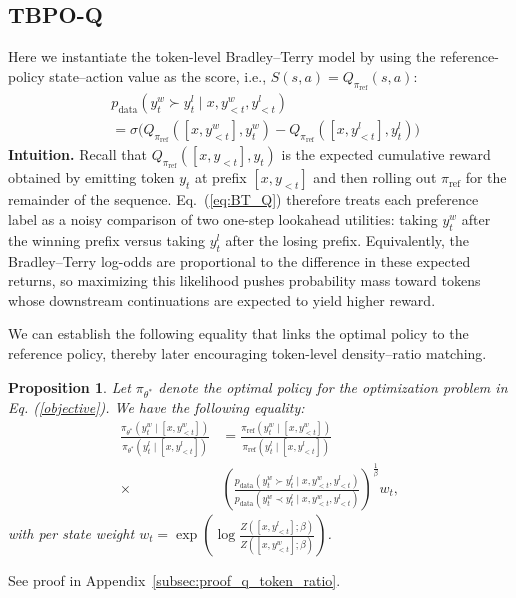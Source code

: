 \documentclass{article}
\theoremstyle{plain}
\newtheorem{proposition}[theorem]{Proposition}
\theoremstyle{definition}
\theoremstyle{remark}
\begin{document}
\subsection{TBPO-Q}
\label{sec:tbpo_q}

Here we instantiate the token-level Bradley--Terry model by using the reference-policy
state--action value as the score, i.e., $S(s,a)=Q_{\pi_{\mathrm{ref}}}(s,a)$:
\begin{equation} \label{eq:BT_Q}
\begin{split}
    &p_{\text{data}}(y^w_t \succ y_t^l \mid x, y^w_{<t}, y^l_{<t}) \\
    &= \sigma\bigl(Q_{\pi_{\mathrm{ref}}}([x, y^w_{<t}], y^w_t) - Q_{\pi_{\mathrm{ref}}}([x, y^l_{<t}], y^l_t)\bigr)
\end{split}
\end{equation}
\noindent\textbf{Intuition.}
Recall that $Q_{\pi_{\mathrm{ref}}}([x,y_{<t}],y_t)$ is the expected cumulative
reward obtained by emitting token $y_t$ at prefix $[x,y_{<t}]$ and then rolling out
$\pi_{\mathrm{ref}}$ for the remainder of the sequence.
Eq.~(\ref{eq:BT_Q}) therefore treats each preference label as a noisy comparison of two
one-step lookahead utilities: taking $y_t^w$ after the winning prefix versus taking $y_t^l$
after the losing prefix.
Equivalently, the Bradley--Terry log-odds are proportional to the difference in these expected
returns, so maximizing this likelihood pushes probability mass toward tokens whose downstream
continuations are expected to yield higher reward.

We can establish the following equality that links the optimal policy to the reference policy,
thereby later encouraging token-level density--ratio matching.
\begin{proposition}
\label{prop:q_token_ratio}
    Let $\pi_{\theta^*}$ denote the optimal policy for the optimization problem in Eq. (\ref{objective}). We have the following equality:
    \begin{equation}
    \begin{split}\frac{\pi_{\theta^*}\!\left(y_{t}^{w}\mid[x,y_{<t}^{w}]\right)}{\pi_{\theta^*}\!\left(y_{t}^{l}\mid[x,y_{<t}^{l}]\right)} & =\frac{\pi_{\mathrm{ref}}\!\left(y_{t}^{w}\mid[x,y_{<t}^{w}]\right)}{\pi_{\mathrm{ref}}\!\left(y_{t}^{l}\mid[x,y_{<t}^{l}]\right)}\\
\times & \left(\frac{p_{\text{data}}(y_{t}^{w}\succ y_{t}^{l}\mid x,y_{<t}^{w},y_{<t}^{l})}{p_{\text{data}}(y_{t}^{w}\prec y_{t}^{l}\mid x,y_{<t}^{w},y_{<t}^{l})}\right)^{\frac{1}{\beta}}w_{t},
\end{split}
    \end{equation}
    with per state weight $w_t = \exp\left(\log \frac{Z([x, y^l_{<t}]; \beta)}{Z([x, y^w_{<t}]; \beta)}\right)$.
\end{proposition}
See proof in Appendix~\ref{subsec:proof_q_token_ratio}.
\end{document}
